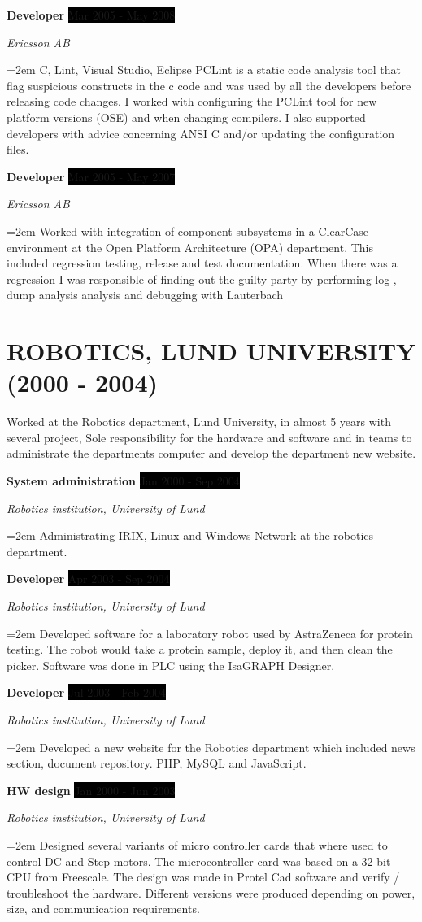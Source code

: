 \documentclass[paper=a4,fontsize=11pt]{scrartcl}
\newcommand{\sepspace}{\vspace*{1em}}
\newcommand{\NewPart}[1]{\section*{\uppercase{#1}}}
\newcommand{\EducationEntry}[4]{
		\noindent \textbf{#1} \hfill 					%
		\colorbox{Black}{%
			\parbox{6em}{%
			\hfill\color{White}#2}} \par				%
		\noindent \textit{#3} \par					%
		\noindent\hangindent=2em\hangafter=0 \small #4 	%
		\normalsize \par}
\newcommand{\WorkEntry}[4]{						%
		\noindent \textbf{#1} \hfill 					%
		\colorbox{Black}{\color{White}#2} \par		%
		\noindent \textit{#3} \par					%
		\noindent\hangindent=2em\hangafter=0 \small #4 	%
		\normalsize \par}
\begin{document}
\WorkEntry{Developer}{Mar 2005 - May 2008}{Ericsson AB}	
  {C, Lint, Visual Studio, Eclipse PCLint is a static code analysis tool that flag suspicious 
    constructs in the c code and was used by all the developers before releasing code changes. 
  I worked with configuring the PCLint tool for new platform versions (OSE) and when changing 
  compilers. I also supported developers with advice concerning ANSI C and/or updating the 
  configuration files. 
  }
\sepspace

\WorkEntry{Developer}{Mar 2005 - May 2007}{Ericsson AB}		
  {Worked with integration of component subsystems in a ClearCase environment at the Open Platform 
  Architecture (OPA) department. This included regression testing, release and test documentation. 
  When there was a regression I was responsible of finding out the guilty party by performing log-, 
  dump analysis analysis and debugging with Lauterbach}
\sepspace

\NewPart{Robotics, Lund University (2000 - 2004)}{Worked at the Robotics department, Lund University,
  in almost 5 years with several project, Sole responsibility for the hardware and software 
  and in teams to administrate the departments computer and develop the department new website.}
\sepspace

\WorkEntry{System administration}{Jan 2000 - Sep 2004}{Robotics institution, University of Lund}		
  {Administrating IRIX, Linux and Windows Network at the robotics department.}
\sepspace

\WorkEntry{Developer}{Apr 2003 - Sep 2004}{Robotics institution, University of Lund}		
  {Developed software for a laboratory robot used by AstraZeneca for protein testing. 
  The robot would take a protein sample, deploy it, and then clean the picker. 
  Software was done in PLC using the IsaGRAPH Designer.}
\sepspace

\WorkEntry{Developer}{Jul 2003 - Feb 2004}{Robotics institution, University of Lund}		
  {Developed a new website for the Robotics department which included news section, document repository. 
  PHP, MySQL and JavaScript.} 
\sepspace

\WorkEntry{HW design}{Jan 2000 - Jun 2003}{Robotics institution, University of Lund}		
{Designed several variants of micro controller cards that where used to control DC and Step motors. The microcontroller card was based on a 32 bit CPU from 
  Freescale. The design was made in Protel Cad software and verify / troubleshoot the hardware. Different versions were produced depending on power, size, and communication requirements.
}
\sepspace
\end{document}
